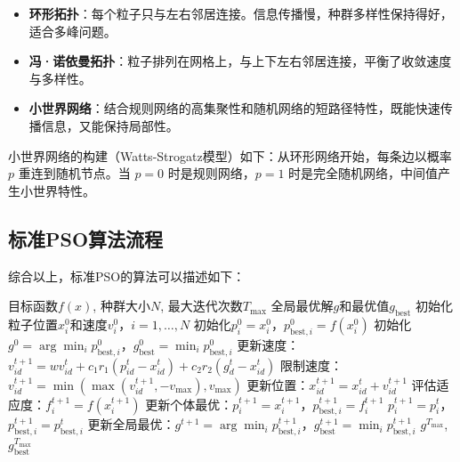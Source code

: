\documentclass[lang=cn,zihao=-4,a4paper,fontset=windows]{beautybook}
\begin{document}
\begin{itemize}
    \item \textbf{环形拓扑}：每个粒子只与左右邻居连接。信息传播慢，种群多样性保持得好，适合多峰问题。
    \item \textbf{冯·诺依曼拓扑}：粒子排列在网格上，与上下左右邻居连接，平衡了收敛速度与多样性。
    \item \textbf{小世界网络}：结合规则网络的高集聚性和随机网络的短路径特性，既能快速传播信息，又能保持局部性。
\end{itemize}

小世界网络的构建（Watts-Strogatz模型）如下：从环形网络开始，每条边以概率 $p$ 重连到随机节点。当 $p=0$ 时是规则网络，$p=1$ 时是完全随机网络，中间值产生小世界特性。

\subsection{标准PSO算法流程}

综合以上，标准PSO的算法可以描述如下：

\begin{algorithm}[H]
\caption{标准粒子群优化算法}
\begin{algorithmic}[1]
\REQUIRE 目标函数$f(x)$, 种群大小$N$, 最大迭代次数$T_{\max}$
\ENSURE 全局最优解$g$和最优值$g_{\text{best}}$
\STATE 初始化粒子位置$x_i^0$和速度$v_i^0$，$i=1,\dots,N$
\STATE 初始化$p_i^0 = x_i^0$，$p_{\text{best},i}^0 = f(x_i^0)$
\STATE 初始化$g^0 = \arg\min_i p_{\text{best},i}^0$，$g_{\text{best}}^0 = \min_i p_{\text{best},i}^0$
            \STATE 更新速度：$v_{id}^{t+1} = w v_{id}^t + c_1 r_1 (p_{id}^t - x_{id}^t) + c_2 r_2 (g_d^t - x_{id}^t)$
            \STATE 限制速度：$v_{id}^{t+1} = \min(\max(v_{id}^{t+1}, -v_{\max}), v_{\max})$
            \STATE 更新位置：$x_{id}^{t+1} = x_{id}^t + v_{id}^{t+1}$
        \ENDFOR
        \STATE 评估适应度：$f_i^{t+1} = f(x_i^{t+1})$
            \STATE 更新个体最优：$p_i^{t+1} = x_i^{t+1}$，$p_{\text{best},i}^{t+1} = f_i^{t+1}$
        \ELSE
            \STATE $p_i^{t+1} = p_i^t$，$p_{\text{best},i}^{t+1} = p_{\text{best},i}^t$
        \ENDIF
    \ENDFOR
    \STATE 更新全局最优：$g^{t+1} = \arg\min_i p_{\text{best},i}^{t+1}$，$g_{\text{best}}^{t+1} = \min_i p_{\text{best},i}^{t+1}$
\ENDFOR
\RETURN $g^{T_{\max}}$, $g_{\text{best}}^{T_{\max}}$
\end{algorithmic}
\end{algorithm}
\end{document}
